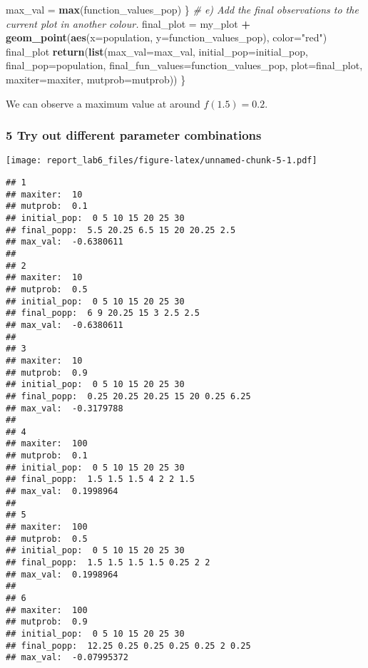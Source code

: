 \documentclass[
]{article}
\newenvironment{Shaded}{\begin{snugshade}}{\end{snugshade}}
\newcommand{\CommentTok}[1]{\textcolor[rgb]{0.56,0.35,0.01}{\textit{#1}}}
\newcommand{\DataTypeTok}[1]{\textcolor[rgb]{0.13,0.29,0.53}{#1}}
\newcommand{\KeywordTok}[1]{\textcolor[rgb]{0.13,0.29,0.53}{\textbf{#1}}}
\newcommand{\NormalTok}[1]{#1}
\newcommand{\OperatorTok}[1]{\textcolor[rgb]{0.81,0.36,0.00}{\textbf{#1}}}
\newcommand{\StringTok}[1]{\textcolor[rgb]{0.31,0.60,0.02}{#1}}
\begin{document}
\begin{Shaded}
\begin{Highlighting}[]
\NormalTok{    max_val =}\StringTok{ }\KeywordTok{max}\NormalTok{(function_values_pop)}
\NormalTok{  \}}
  \CommentTok{# e) Add the final observations to the current plot in another colour.}
\NormalTok{  final_plot =}\StringTok{ }\NormalTok{my_plot }\OperatorTok{+}\StringTok{ }\KeywordTok{geom_point}\NormalTok{(}\KeywordTok{aes}\NormalTok{(}\DataTypeTok{x=}\NormalTok{population, }\DataTypeTok{y=}\NormalTok{function_values_pop), }\DataTypeTok{color=}\StringTok{"red"}\NormalTok{)}
\NormalTok{  final_plot}
  \KeywordTok{return}\NormalTok{(}\KeywordTok{list}\NormalTok{(}\DataTypeTok{max_val=}\NormalTok{max_val, }\DataTypeTok{initial_pop=}\NormalTok{initial_pop, }\DataTypeTok{final_pop=}\NormalTok{population, }\DataTypeTok{final_fun_values=}\NormalTok{function_values_pop, }\DataTypeTok{plot=}\NormalTok{final_plot, }\DataTypeTok{maxiter=}\NormalTok{maxiter, }\DataTypeTok{mutprob=}\NormalTok{mutprob))}
\NormalTok{\}}
\end{Highlighting}
\end{Shaded}

We can observe a maximum value at around \(f(1.5) = 0.2\).

\hypertarget{try-out-different-parameter-combinations}{%
\subsubsection{5 Try out different parameter
combinations}\label{try-out-different-parameter-combinations}}

\texttt{[image: report\_lab6\_files/figure-latex/unnamed-chunk-5-1.pdf]}

\begin{verbatim}
## 1 
## maxiter:  10 
## mutprob:  0.1 
## initial_pop:  0 5 10 15 20 25 30 
## final_popp:  5.5 20.25 6.5 15 20 20.25 2.5 
## max_val:  -0.6380611 
## 
## 2 
## maxiter:  10 
## mutprob:  0.5 
## initial_pop:  0 5 10 15 20 25 30 
## final_popp:  6 9 20.25 15 3 2.5 2.5 
## max_val:  -0.6380611 
## 
## 3 
## maxiter:  10 
## mutprob:  0.9 
## initial_pop:  0 5 10 15 20 25 30 
## final_popp:  0.25 20.25 20.25 15 20 0.25 6.25 
## max_val:  -0.3179788 
## 
## 4 
## maxiter:  100 
## mutprob:  0.1 
## initial_pop:  0 5 10 15 20 25 30 
## final_popp:  1.5 1.5 1.5 4 2 2 1.5 
## max_val:  0.1998964 
## 
## 5 
## maxiter:  100 
## mutprob:  0.5 
## initial_pop:  0 5 10 15 20 25 30 
## final_popp:  1.5 1.5 1.5 1.5 0.25 2 2 
## max_val:  0.1998964 
## 
## 6 
## maxiter:  100 
## mutprob:  0.9 
## initial_pop:  0 5 10 15 20 25 30 
## final_popp:  12.25 0.25 0.25 0.25 0.25 2 0.25 
## max_val:  -0.07995372
\end{verbatim}
\end{document}
